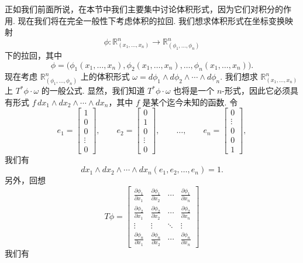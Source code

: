 正如我们前面所说，在本节中我们主要集中讨论体积形式，因为它们对积分的作用. 现在我们将在完全一般性下考虑体积的拉回. 我们想求体积形式在坐标变换映射
\[
\phi:\mathbb{R}^n_{(x_1,\ldots,x_n)}\to\mathbb{R}^n_{(\phi_1,\ldots,\phi_n)}
\]
下的拉回，其中
\[
\phi=\bigl(\phi_1(x_1,\ldots,x_n),\phi_2(x_1,\ldots,x_n),\ldots,\phi_n(x_1,\ldots,x_n)\bigr).
\]
现在考虑 $\mathbb{R}^n_{(\phi_1,\ldots,\phi_n)}$ 上的体积形式 $\omega=d\phi_1\wedge d\phi_2\wedge\cdots\wedge d\phi_n$. 我们想求 $\mathbb{R}^n_{(x_1,\ldots,x_n)}$ 上 $T^*\phi\cdot\omega$ 的一般公式. 显然，我们知道 $T^*\phi\cdot\omega$ 也将是一个 $n$-形式，因此它必须具有形式 $f\,dx_1\wedge dx_2\wedge\cdots\wedge dx_n$，其中 $f$ 是某个迄今未知的函数. 令
\[
e_1=\begin{bmatrix}1\\0\\0\\\vdots\\0\end{bmatrix},\qquad
e_2=\begin{bmatrix}0\\1\\0\\\vdots\\0\end{bmatrix},\qquad\ldots,\qquad
e_n=\begin{bmatrix}0\\\vdots\\0\\0\\1\end{bmatrix},
\]
我们有
\[
dx_1\wedge dx_2\wedge\cdots\wedge dx_n(e_1,e_2,\ldots,e_n)=1.
\]
另外，回想
\[
T\phi=
\begin{bmatrix}
\frac{\partial\phi_1}{\partial x_1}&\frac{\partial\phi_1}{\partial x_2}&\cdots&\frac{\partial\phi_1}{\partial x_n}\\
\frac{\partial\phi_2}{\partial x_1}&\frac{\partial\phi_2}{\partial x_2}&\cdots&\frac{\partial\phi_2}{\partial x_n}\\
\vdots&\vdots&\ddots&\vdots\\
\frac{\partial\phi_n}{\partial x_1}&\frac{\partial\phi_n}{\partial x_2}&\cdots&\frac{\partial\phi_n}{\partial x_n}
\end{bmatrix}
\]
我们有
